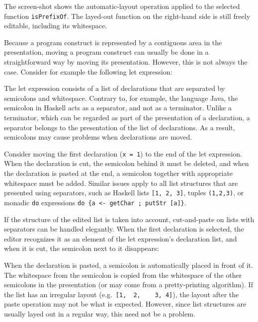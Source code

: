 The screen-shot shows the automatic-layout operation applied to the selected function {\tt isPrefixOf}. The layed-out function on the right-hand side is still freely editable, including its whitespace.


Because a program construct is represented by a contiguous area in the presentation, moving a program construct can usually be done in a straightforward way by moving its presentation. However, this is not always the case. Consider for example the following let expression:


The let expression consists of a list of declarations that are separated by semicolons and whitespace. Contrary to, for example, the language Java, the semicolon in Haskell acts as a separator, and not as a terminator. Unlike a terminator, which can be regarded as part of the presentation of a declaration, a separator belongs to the presentation of the list of declarations. As a result, semicolons may cause problems when declarations are moved.

Consider moving the first declaration (\verb|x = 1|) to the end of the let expression. When the declaration is cut, the semicolon behind it must be deleted, and when the declaration is pasted at the end, a semicolon together with appropriate whitespace must be added. Similar issues apply to all list structures that are presented using separators, such as Haskell lists \verb|[1, 2, 3]|, tuples \verb|(1,2,3)|, or monadic \verb|do| expressions \verb|do {a <- getChar ; putStr [a]}|.

If the structure of the edited list is taken into account, cut-and-paste on lists with separators can be handled elegantly. When the first declaration is selected, the editor recognizes it as an element of the let expression's declaration list, and when it is cut, the semicolon next to it disappears:


When the declaration is pasted, a semicolon is automatically placed in front of it. The whitespace from the semicolon is copied from the whitespace of the other semicolons in the presentation (or may come from a pretty-printing algorithm). If the list has an irregular layout (e.g.\ \verb|[1,  2,    3, 4]|), the layout after the paste operation may not be what is expected. However, since list structures are usually layed out in a regular way, this need not be a problem.

